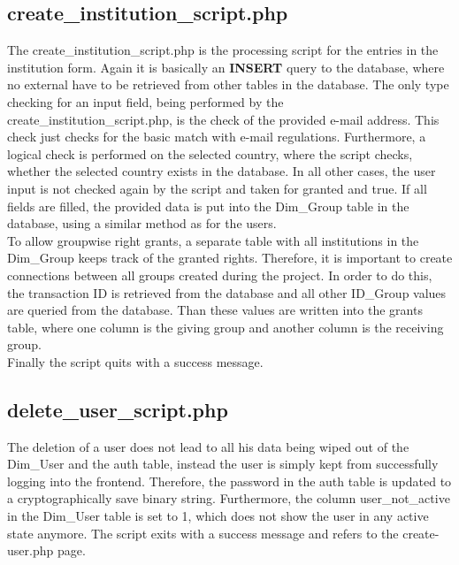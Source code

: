 \subsection{create\_institution\_script.php}
The create\_institution\_script.php is the processing script for the entries in the institution form. Again it is basically an \textbf{INSERT} query to the database, where no 
external have to be retrieved from other tables in the database. The only type checking for an input field, being performed by the create\_institution\_script.php, is the check 
of the provided e-mail address. This check just checks for the basic match with e-mail regulations. Furthermore, a logical check is performed on the selected country, where the 
script checks, whether the selected country exists in the database. In all other cases, the user input is not checked again by the script and taken for granted and true. 
If all fields are filled, the provided data is put into the Dim\_Group table in the database, using a similar method as for the users.\\
To allow groupwise right grants, a separate table with all institutions in the Dim\_Group keeps track of the granted rights. Therefore, it is important to create connections between 
all groups created during the project. In order to do this, the transaction ID is retrieved from the database and all other ID\_Group values are queried from the database. Than 
these values are written into the grants table, where one column is the giving group and another column is the receiving group. \\
Finally the script quits with a success message.

\subsection{delete\_user\_script.php}
The deletion of a user does not lead to all his data being wiped out of the Dim\_User and the auth table, instead the user is simply kept from successfully logging into the frontend. 
Therefore, the password in the auth table is updated to a cryptographically save binary string. Furthermore, the column user\_not\_active in the Dim\_User table is set to 1, which 
does not show the user in any active state anymore. The script exits with a success message and refers to the create-user.php page.

